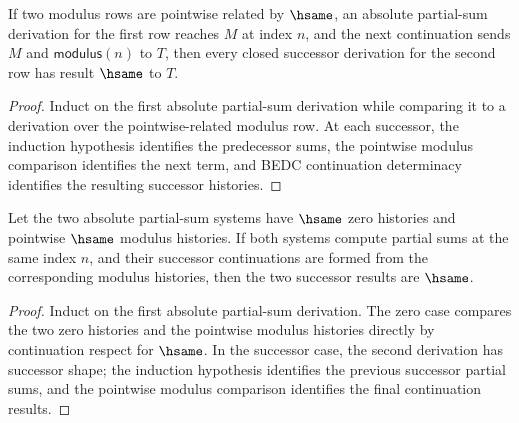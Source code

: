 \begin{lemma}
\label{lem:complex-abs-part-sum-modulus-successor-result-deterministic}
If two modulus rows are pointwise related by $\hsame$, an absolute partial-sum
derivation for the first row reaches $M$ at index $n$, and the next continuation
sends $M$ and $\mathsf{modulus}(n)$ to $T$, then every closed successor
derivation for the second row has result $\hsame$ to $T$.
\end{lemma}
\begin{proof}
Induct on the first absolute partial-sum derivation while comparing it to a
derivation over the pointwise-related modulus row. At each successor, the
induction hypothesis identifies the predecessor sums, the pointwise modulus
comparison identifies the next term, and BEDC continuation determinacy
identifies the resulting successor histories.
\end{proof}
\begin{lemma}
\label{thm:complex-abs-part-sum-modulus-hsame-successor-result}
Let the two absolute partial-sum systems have $\hsame$ zero histories and
pointwise $\hsame$ modulus histories. If both systems compute partial sums at
the same index $n$, and their successor continuations are formed from the
corresponding modulus histories, then the two successor results are $\hsame$.
\end{lemma}
\begin{proof}
Induct on the first absolute partial-sum derivation. The zero case compares
the two zero histories and the pointwise modulus histories directly by
continuation respect for $\hsame$. In the successor case, the second derivation
has successor shape; the induction hypothesis identifies the previous successor
partial sums, and the pointwise modulus comparison identifies the final
continuation results.
\end{proof}

